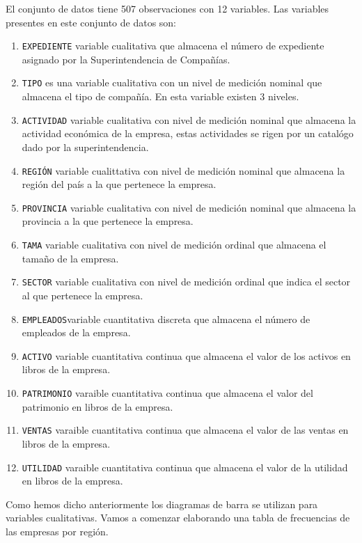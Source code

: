\documentclass[letterpaper,]{book}
\providecommand{\tightlist}{%
  \setlength{\itemsep}{0pt}\setlength{\parskip}{0pt}}
\begin{document}
El conjunto de datos tiene 507 observaciones con 12 variables. Las variables presentes en este conjunto de datos son:

\begin{enumerate}
\def\labelenumi{\arabic{enumi}.}
\tightlist
\item
  \texttt{EXPEDIENTE} variable cualitativa que almacena el número de expediente asignado por la Superintendencia de Compañías.
\item
  \texttt{TIPO} es una variable cualitativa con un nivel de medición nominal que almacena el tipo de compañía. En esta variable existen 3 niveles.
\item
  \texttt{ACTIVIDAD} variable cualitativa con nivel de medición nominal que almacena la actividad económica de la empresa, estas actividades se rigen por un catalógo dado por la superintendencia.
\item
  \texttt{REGIÓN} variable cualittativa con nivel de medición nominal que almacena la región del país a la que pertenece la empresa.
\item
  \texttt{PROVINCIA} variable cualitativa con nivel de medición nominal que almacena la provincia a la que pertenece la empresa.
\item
  \texttt{TAMA} variable cualitativa con nivel de medición ordinal que almacena el tamaño de la empresa.
\item
  \texttt{SECTOR} variable cualitativa con nivel de medición ordinal que indica el sector al que pertenece la empresa.
\item
  \texttt{EMPLEADOS}variable cuantitativa discreta que almacena el número de empleados de la empresa.
\item
  \texttt{ACTIVO} variable cuantitativa continua que almacena el valor de los activos en libros de la empresa.
\item
  \texttt{PATRIMONIO} varaible cuantitativa continua que almacena el valor del patrimonio en libros de la empresa.
\item
  \texttt{VENTAS} varaible cuantitativa continua que almacena el valor de las ventas en libros de la empresa.
\item
  \texttt{UTILIDAD} varaible cuantitativa continua que almacena el valor de la utilidad en libros de la empresa.
\end{enumerate}

Como hemos dicho anteriormente los diagramas de barra se utilizan para variables cualitativas. Vamos a comenzar elaborando una tabla de frecuencias de las empresas por región.
\end{document}
